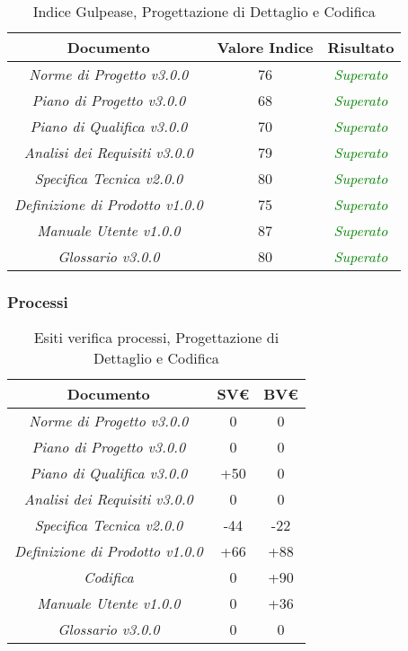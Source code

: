 \hspace{1cm}

\begin{table}[h]
	\begin{tabular}{|c|c|c|}
		\hline 
		\textbf{Documento} & \textbf{Valore Indice} & \textbf{Risultato} \\ 
		\hline
		\textit{Norme di Progetto v3.0.0} & 76 & \textcolor{green}{\textit{Superato}} \\  
		\textit{Piano di Progetto v3.0.0} & 68 & \textcolor{green}{\textit{Superato}} \\ 
		\textit{Piano di Qualifica v3.0.0} & 70 & \textcolor{green}{\textit{Superato}} \\ 
		\textit{Analisi dei Requisiti v3.0.0} & 79 & \textcolor{green}{\textit{Superato}} \\
		\textit{Specifica Tecnica v2.0.0} & 80 & \textcolor{green}{\textit{Superato}} \\ 
		\textit{Definizione di Prodotto v1.0.0} & 75 & \textcolor{green}{\textit{Superato}} \\ 
		\textit{Manuale Utente v1.0.0} & 87 & \textcolor{green}{\textit{Superato}} \\ 
		\textit{Glossario v3.0.0} & 80 & \textcolor{green}{\textit{Superato}} \\ 
		\hline 
\end{tabular}
\caption{Indice Gulpease, Progettazione di Dettaglio e Codifica}
\end{table}

\subsubsection{Processi}
\label{appendice 6}
\vspace{3mm}

\begin{table}[h]
	\begin{tabular}{|c|c|c|}
		\toprule
			\textbf{Documento} & \textbf{SV\euro} & \textbf{BV\euro} \\ 
		\midrule
		\midrule
			\textit{Norme di Progetto v3.0.0} & 0 & 0 \\  
			\textit{Piano di Progetto v3.0.0} & 0 & 0 \\ 
			\textit{Piano di Qualifica v3.0.0} & +50 & 0 \\ 
			\textit{Analisi dei Requisiti v3.0.0} & 0 & 0 \\
			\textit{Specifica Tecnica v2.0.0} & -44 & -22 \\ 
			\textit{Definizione di Prodotto v1.0.0} & +66 & +88 \\
			\textit{Codifica} & 0 & +90 \\
			\textit{Manuale Utente v1.0.0} & 0 & +36 \\
			\textit{Glossario v3.0.0} & 0 & 0 \\ 
		\bottomrule
	\end{tabular}
\caption{Esiti verifica processi, Progettazione di Dettaglio e Codifica}
\end{table}

